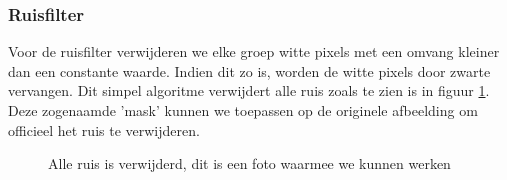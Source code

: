 \documentclass[a4paper,kulak]{kulakarticle}
\begin{document}
	\subsubsection{Ruisfilter}
		Voor de ruisfilter verwijderen we elke groep witte pixels met een omvang kleiner dan een constante waarde. Indien dit zo is, worden de witte pixels door zwarte vervangen. Dit simpel algoritme verwijdert alle ruis zoals te zien is in figuur \ref{figuur ruisfilter}. Deze zogenaamde 'mask' kunnen we toepassen op de originele afbeelding om officieel het ruis te verwijderen.

	\begin{figure}[H]
	\centering
	
	\caption{Alle ruis is verwijderd, dit is een foto waarmee we kunnen werken}
	\label{figuur ruisfilter}
	\end{figure}
\end{document}
